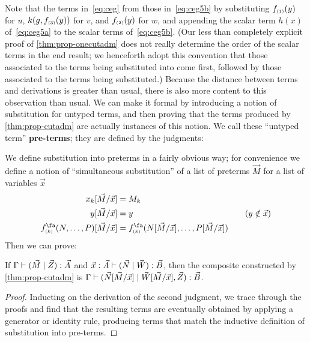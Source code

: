 \begin{props}
Note that the terms in~\eqref{eq:ceg} from those in~\eqref{eq:ceg5b} by substituting $f_{\scriptscriptstyle(1)}(y)$ for $u$, $k(g,f_{\scriptscriptstyle(3)}(y))$ for $v$, and $f_{\scriptscriptstyle(2)}(y)$ for $w$, and appending the scalar term $h(x)$ of~\eqref{eq:ceg5a} to the scalar terms of~\eqref{eq:ceg5b}.
(Our less than completely explicit proof of \cref{thm:prop-onecutadm} does not really determine the order of the scalar terms in the end result; we henceforth adopt this convention that those associated to the terms being substituted into come first, followed by those associated to the terms being substituted.)
Because the distance between terms and derivations is greater than usual, there is also more content to this observation than usual.
We can make it formal by introducing a notion of substitution for untyped terms, and then proving that the terms produced by \cref{thm:prop-cutadm} are actually instances of this notion.
We call these ``untyped term'' \textbf{pre-terms}; they are defined by the judgments:
We define substitution into preterms in a fairly obvious way; for convenience we define a notion of ``simultaneous substitution'' of a list of preterms $\vec M$ for a list of variables $\vec x$
\begin{alignat*}{2}
  x_k[\vec M/\vec x] &= M_k\\
  y[\vec M/\vec x] &= y &\quad (y\notin \vec x)\\
  f^\fa\s k(N,\dots,P)[\vec M/\vec x] &= f^\fa\s k(N[\vec M/\vec x],\dots,P[\vec M/\vec x])
\end{alignat*}
Then we can prove:

\begin{lem}\label{thm:prop-cutissub}
  If $\Gamma \vdash (\vec M\mid \vec Z):\vec A$ and $\vec x:\vec A \vdash (\vec N\mid \vec W):\vec B$, then the composite constructed by \cref{thm:prop-cutadm} is $\Gamma \vdash (\vec N[\vec M/\vec x]\mid \vec W[\vec M/\vec x],\vec Z):\vec B$.
\end{lem}
\begin{proof}
  Inducting on the derivation of the second judgment, we trace through the proofs and find that the resulting terms are eventually obtained by applying a generator or identity rule, producing terms that match the inductive definition of substitution into pre-terms.
\end{proof}


\end{props}

